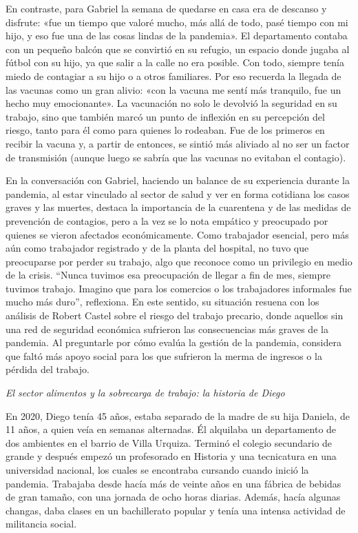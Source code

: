 En contraste, para Gabriel la semana de quedarse en casa era de descanso y disfrute: «fue un tiempo que valoré mucho, más allá de todo, pasé tiempo con mi hijo, y eso fue una de las cosas lindas de la pandemia». El departamento contaba con un pequeño balcón que se convirtió en su refugio, un espacio donde jugaba al fútbol con su hijo, ya que salir a la calle no era posible. Con todo, siempre tenía miedo de contagiar a su hijo o a otros familiares. Por eso recuerda la llegada de las vacunas como un gran alivio: «con la vacuna me sentí más tranquilo, fue un hecho muy emocionante». La vacunación no solo le devolvió la seguridad en su trabajo, sino que también marcó un punto de inflexión en su percepción del riesgo, tanto para él como para quienes lo rodeaban. Fue de los primeros en recibir la vacuna y, a partir de entonces, se sintió más aliviado al no ser un factor de transmisión (aunque luego se sabría que las vacunas no evitaban el contagio).

En la conversación con Gabriel, haciendo un balance de su experiencia durante la pandemia, al estar vinculado al sector de salud y ver en forma cotidiana los casos graves y las muertes, destaca la importancia de la cuarentena y de las medidas de prevención de contagios, pero a la vez se lo nota empático y preocupado por quienes se vieron afectados económicamente. Como trabajador esencial, pero más aún como trabajador registrado y de la planta del hospital, no tuvo que preocuparse por perder su trabajo, algo que reconoce como un privilegio en medio de la crisis. ``Nunca tuvimos esa preocupación de llegar a fin de mes, siempre tuvimos trabajo. Imagino que para los comercios o los trabajadores informales fue mucho más duro'', reflexiona. En este sentido, su situación resuena con los análisis de Robert Castel sobre el riesgo del trabajo precario, donde aquellos sin una red de seguridad económica sufrieron las consecuencias más graves de la pandemia. Al preguntarle por cómo evalúa la gestión de la pandemia, considera que faltó más apoyo social para los que sufrieron la merma de ingresos o la pérdida del trabajo.

\emph{El sector alimentos y la sobrecarga de trabajo: la historia de Diego}

En 2020, Diego tenía 45 años, estaba separado de la madre de su hija Daniela, de 11 años, a quien veía en semanas alternadas. Él alquilaba un departamento de dos ambientes en el barrio de Villa Urquiza. Terminó el colegio secundario de grande y después empezó un profesorado en Historia y una tecnicatura en una universidad nacional, los cuales se encontraba cursando cuando inició la pandemia. Trabajaba desde hacía más de veinte años en una fábrica de bebidas de gran tamaño, con una jornada de ocho horas diarias. Además, hacía algunas changas, daba clases en un bachillerato popular y tenía una intensa actividad de militancia social.

